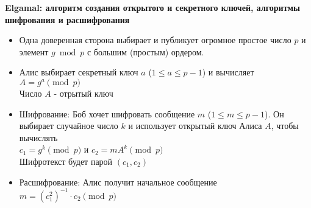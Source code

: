 \textbf{Elgamal: алгоритм создания открытого и секретного ключей, алгоритмы шифрования и расшифрования} \cite{introcrypto}
\begin{itemize}[label={--},noitemsep,nolistsep]
	\item Одна доверенная сторона выбирает и публикует огромное простое число $p$ и элемент $g \bmod p$ с большим (простым) ордером.
	\item Алис выбирает секретный ключ $a$ ($1 \leq a \leq p-1$) и вычисляет $A = g^a \pmod p$ \\ Число $A$ - отрытый ключ
	\item Шифрование: Боб хочет шифровать сообщение $m$ ($1 \leq m \leq p-1$). Он выбирает случайное число $k$ и использует открытый ключ Алиса $A$, чтобы вычислять \\ $c_1 = g^k \pmod p$ и $c_2 = mA^k \pmod p$ \\ Шифротекст будет парой $(c_1, c_2)$
	\item Расшифрование: Алис получит начальное сообщение $m = (c_1^2)^{-1} \cdot c_2 \pmod p$
\end{itemize}

